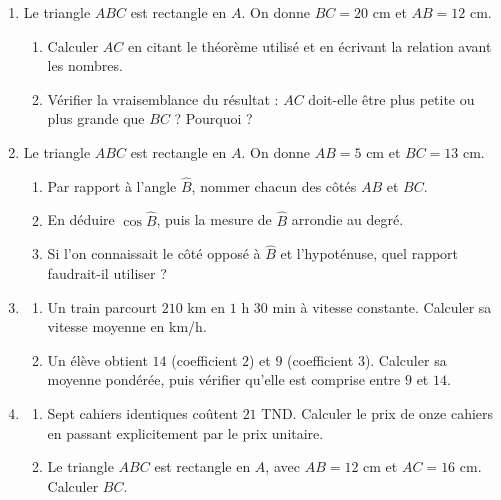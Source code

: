 \documentclass[10pt,a4paper]{article}
\begin{document}
\begin{enumerate}
\needspace{22mm}
\item[\textbf{B1.}] Le triangle $ABC$ est rectangle en $A$. On donne $BC = 20$ cm et $AB = 12$ cm.
\begin{enumerate}
\item Calculer $AC$ en citant le théorème utilisé et en écrivant la relation avant les nombres.
\item Vérifier la vraisemblance du résultat : $AC$ doit-elle être plus petite ou plus grande que $BC$ ? Pourquoi ?
\end{enumerate}
\par\vspace{1.2mm}
\needspace{22mm}
\item[\textbf{B2.}] Le triangle $ABC$ est rectangle en $A$. On donne $AB = 5$ cm et $BC = 13$ cm.
\begin{enumerate}
\item Par rapport à l'angle $\widehat{B}$, nommer chacun des côtés $AB$ et $BC$.
\item En déduire $\cos\widehat{B}$, puis la mesure de $\widehat{B}$ arrondie au degré.
\item Si l'on connaissait le côté opposé à $\widehat{B}$ et l'hypoténuse, quel rapport faudrait-il utiliser ?
\end{enumerate}
\par\vspace{1.2mm}
\needspace{22mm}
\item[\textbf{B3.}] \begin{enumerate}
\item Un train parcourt $210$ km en $1$ h $30$ min à vitesse constante. Calculer sa vitesse moyenne en km/h.
\item Un élève obtient $14$ (coefficient $2$) et $9$ (coefficient $3$). Calculer sa moyenne pondérée, puis vérifier
qu'elle est comprise entre $9$ et $14$.
\end{enumerate}
\par\vspace{1.2mm}
\needspace{22mm}
\item[\textbf{B4.}] \begin{enumerate}
\item Sept cahiers identiques coûtent $21$ TND. Calculer le prix de onze cahiers en passant explicitement par le prix unitaire.
\item Le triangle $ABC$ est rectangle en $A$, avec $AB = 12$ cm et $AC = 16$ cm. Calculer $BC$.
\end{enumerate}
\par\vspace{1.2mm}
\end{enumerate}
\end{document}

